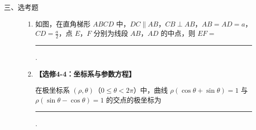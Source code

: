 \begin{description}

    \item[三、选考题]

    \begin{enumerate}[leftmargin=5pt]

      \addtocounter{enumi}{+13}

        \item 如图，在直角梯形 \(ABCD\) 中，\(DC \parallel AB\)，\(CB \perp AB\)，\(AB = AD = a\)，\(CD = \frac{a}{2}\)，点 \(E\)，\(F\) 分别为线段 \(AB\)，\(AD\) 的中点，则 \(EF =\)\rule[-0.3ex]{3em}{0.4pt}.

        \item \textbf{【选修4-4：坐标系与参数方程】}

在极坐标系 \((\rho, \theta)\)（\(0 \leqslant \theta < 2\pi\)）中，曲线 \(\rho(\cos \theta + \sin \theta) = 1\) 与 \(\rho(\sin \theta - \cos \theta) = 1\) 的交点的极坐标为\rule[-0.3ex]{3em}{0.4pt}.

    \end{enumerate}

\end{description}


